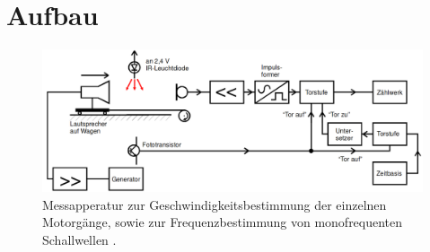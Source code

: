 \section{Aufbau}
\label{sec:Aufbau}
\begin{figure}[H]
         \centering
         \includegraphics[width=\linewidth-50pt,height=\textheight-50pt,keepaspectratio]{content/Bilder/Aufbauf.png}
         \caption{Messapperatur zur Geschwindigkeitsbestimmung der einzelnen Motorgänge, sowie zur Frequenzbestimmung von monofrequenten Schallwellen \cite{V104}.}
         \label{fig:Aufbau}
       \end{figure}

